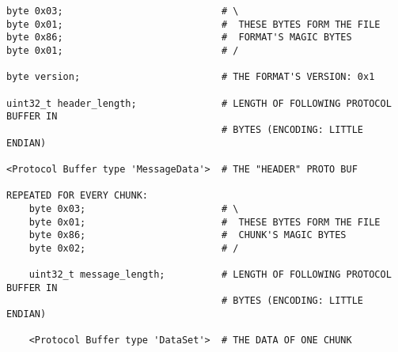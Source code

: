 \begin{verbatim}
byte 0x03;                            # \
byte 0x01;                            #  THESE BYTES FORM THE FILE
byte 0x86;                            #  FORMAT'S MAGIC BYTES
byte 0x01;                            # /

byte version;                         # THE FORMAT'S VERSION: 0x1

uint32_t header_length;               # LENGTH OF FOLLOWING PROTOCOL BUFFER IN
                                      # BYTES (ENCODING: LITTLE ENDIAN)

<Protocol Buffer type 'MessageData'>  # THE "HEADER" PROTO BUF

REPEATED FOR EVERY CHUNK:
    byte 0x03;                        # \
    byte 0x01;                        #  THESE BYTES FORM THE FILE
    byte 0x86;                        #  CHUNK'S MAGIC BYTES
    byte 0x02;                        # /

    uint32_t message_length;          # LENGTH OF FOLLOWING PROTOCOL BUFFER IN
                                      # BYTES (ENCODING: LITTLE ENDIAN)

    <Protocol Buffer type 'DataSet'>  # THE DATA OF ONE CHUNK
\end{verbatim}
